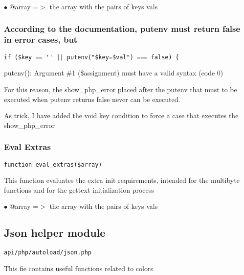 \documentclass[a4paper]{article}
\begin{document}
\begin{compactitem}
\item[\color{myblue}$\bullet$] @array =$>$ the array with the pairs of keys vals
\end{compactitem}

\hypertarget{toc156}{}
\subsubsection{According to the documentation, putenv must return false in error cases, but}

\begin{lstlisting}
if ($key == '' || putenv("$key=$val") === false) {
\end{lstlisting}

putenv(): Argument \#1 (\$assignment) must have a valid syntax (code 0)

For this reason, the show\_php\_error placed after the putenv that must to
be executed when putenv returns false never can be executed.

As trick, I have added the void key condition to force a case that executes
the show\_php\_error

\hypertarget{toc157}{}
\subsubsection{Eval Extras}

\begin{lstlisting}
function eval_extras($array)
\end{lstlisting}

This function evaluates the extra init requirements, intended for the multibyte
functions and for the gettext initialization process

\begin{compactitem}
\item[\color{myblue}$\bullet$] @array =$>$ the array with the pairs of keys vals
\end{compactitem}

\hypertarget{toc158}{}
\subsection{Json helper module}

\begin{lstlisting}
api/php/autoload/json.php
\end{lstlisting}

This fie contains useful functions related to colors
\end{document}
